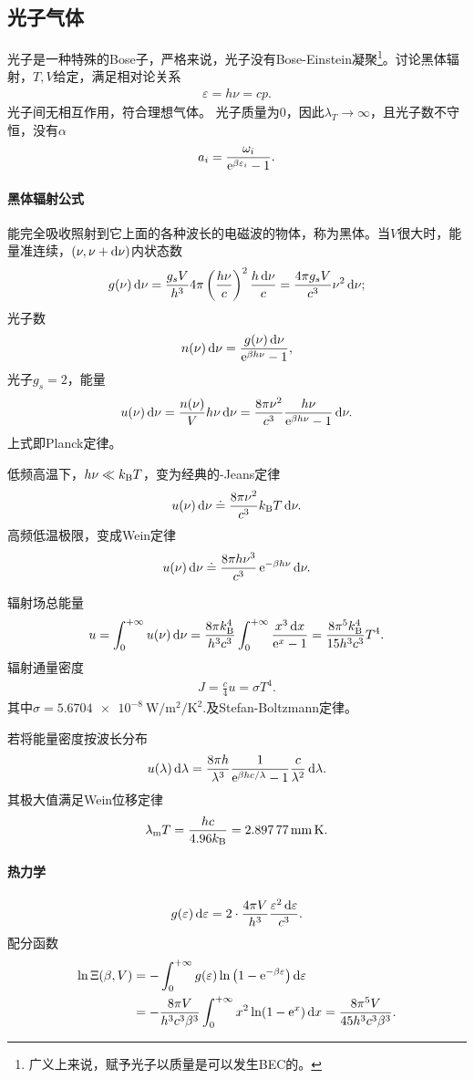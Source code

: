 \subsection{光子气体}
光子是一种特殊的Bose子，严格来说，光子没有Bose-Einstein凝聚\footnote{广义上来说，赋予光子以质量是可以发生BEC的。}。讨论黑体辐射，$T,V$给定，满足相对论关系
\begin{align}
	\varepsilon=h\nu=cp.
\end{align}
光子间无相互作用，符合理想气体。%
光子质量为0，因此$\lambda_T\to\infty$，且光子数不守恒，没有$\alpha$
\[
	a_i=\frac{\omega_i}{\mathop{}\!\mathrm{e}^{\beta\varepsilon_i}-1}.
\]
\paragraph*{黑体辐射公式}能完全吸收照射到它上面的各种波长的电磁波的物体，称为黑体。当$V$很大时，能量准连续，$(\nu,\nu+\mathop{}\!\mathrm{d}\nu)$内状态数
\[
	g(\nu)\mathop{}\!\mathrm{d}\nu=\frac{g_sV}{h^3}4\pi\left(\frac{h\nu}c\right)^2\frac{h\mathop{}\!\mathrm{d}\nu}{c}=\frac{4\pi g_sV}{c^3}\nu^2\mathop{}\!\mathrm{d}\nu;
\]
光子数 
\[
	n(\nu)\mathop{}\!\mathrm{d}\nu=\frac{g(\nu)\mathop{}\!\mathrm{d}\nu}{\mathop{}\!\mathrm{e}^{\beta h\nu}-1},
\]
光子$g_s=2$，能量 
\begin{align}
	u(\nu)\mathop{}\!\mathrm{d}\nu=\frac{n(\nu)}Vh\nu\mathop{}\!\mathrm{d}\nu=\frac{8\pi\nu^2}{c^3}\frac{h\nu}{\mathop{}\!\mathrm{e}^{\beta h\nu}-1}\mathop{}\!\mathrm{d}\nu.
\end{align}
上式即Planck定律。

低频高温下，$h\nu\ll k_{\mathrm B} T$，变为经典的\Rayl-Jeans定律
\[
	u(\nu)\mathop{}\!\mathrm{d}\nu\doteq\frac{8\pi\nu^2}{c^3}k_{\mathrm B} T\mathop{}\!\mathrm{d}\nu.
\]
高频低温极限，变成Wein定律
\[
	u(\nu)\mathop{}\!\mathrm{d}\nu\doteq\frac{8\pi h\nu^3}{c^3}\mathop{}\!\mathrm{e}^{-\beta h\nu}\mathop{}\!\mathrm{d}\nu.
\]

辐射场总能量
\[
	u=\int_0^{+\infty} u(\nu)\mathop{}\!\mathrm{d}\nu=\frac{8\pi k_{\mathrm B}^4}{h^3c^3}\int_0^{+\infty}\frac{x^3\mathop{}\!\mathrm{d} x}{\mathop{}\!\mathrm{e}^ x-1}=\frac{8\pi^5k_{\mathrm B}^4}{15h^3c^3}T^4.
\]
辐射通量密度
\begin{align}
	J=\frac c4u=\sigma T^4.
\end{align}
其中$\sigma=\SI{5.6704e-8}{\W\per\m\squared\per\K\squared}.$及Stefan-Boltzmann定律。

若将能量密度按波长分布
\[
	u(\lambda)\mathop{}\!\mathrm{d}\lambda=\frac{8\pi h}{\lambda^3}\frac{1}{\mathop{}\!\mathrm{e}^{\beta hc/\lambda}-1}\frac c{\lambda^2}\mathop{}\!\mathrm{d}\lambda.
\]
其极大值满足Wein位移定律
\begin{align}
	\lambda_\mathrm mT=\frac{hc}{4.96\kB}=\SI{2.89777}{\mm\K}.
\end{align}
\paragraph*{热力学}
\[
	g(\varepsilon)\mathop{}\!\mathrm{d}\varepsilon=2\cdot\frac{4\pi V}{h^3}\frac{\varepsilon^2\mathop{}\!\mathrm{d}\varepsilon}{c^3}.
\]
配分函数
\begin{align*}
	\ln\Xi(\beta,V)&=-\int_0^{+\infty} g(\varepsilon)\ln\left(1-\mathop{}\!\mathrm{e}^{-\beta\varepsilon}\right)\mathop{}\!\mathrm{d}\varepsilon\\
	&=-\frac{8\pi V}{h^3c^3\beta^3}\int_0^{+\infty} x^2\ln(1-\mathop{}\!\mathrm{e}^ x)\mathop{}\!\mathrm{d} x=\frac{8\pi^5V}{45h^3c^3\beta^3}.
\end{align*}

